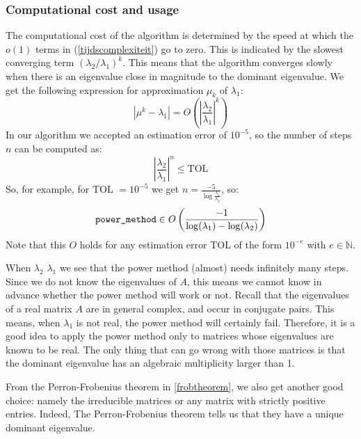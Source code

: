 \documentclass[a4paper,11pt]{report}
\newcommand{\N}{{\mathbb N}}
\begin{document}
\subsubsection{Computational cost and usage}
The computational cost of the algorithm is determined by the speed at which the 
$o(1)$ terms in (\ref{tijdscomplexiteit}) go to zero. This is indicated by the slowest converging term $(\lambda_2/\lambda_1)^k$. This means
that  the algorithm converges slowly when there is an eigenvalue close in magnitude to the dominant eigenvalue. We 
get the following expression for approximation $\mu_k$ of $\lambda_1$:
$$|\mu^k - \lambda_1| = O\left(\left|\frac{\lambda_2}{\lambda_1} \right|^k\right)$$
In our algorithm we accepted an estimation error of $10^{-5}$, so the number of 
steps $n$ can be computed as:
$$\left|\frac{\lambda_2}{\lambda_1} \right|^n \leq \text{TOL}$$
So, for example, for TOL $= 10^{-5}$ we get $n = \frac{-5}{\log{\frac{\lambda_1}{\lambda_2}}}$, so:
$$\text{\texttt{power\_method}} \in O\left(\frac{-1}{\log(\lambda_1) - \log(\lambda_2)}\right)$$
Note that this $O$ holds for any estimation error TOL of the form $10^{-e}$ with $e \in \N$. 

When $\lambda_2$ \approx $\lambda_1$ we see that the power method (almost) needs infinitely 
many steps. Since we do not know the eigenvalues of $A$, this means 
we cannot know in advance whether the power method will work or not. Recall that 
the eigenvalues of a real matrix $A$ are in general complex, and occur in 
conjugate pairs. This means, when $\lambda_1$ is not real, 
the power method will certainly fail. Therefore, it is a good idea to apply the 
power method only to matrices whose eigenvalues are known to be real. The only 
thing that can go wrong with those matrices is that the dominant eigenvalue has 
an algebraic multiplicity larger than 1. 

From the Perron-Frobenius theorem in \ref{frobtheorem}, we also get another good choice: namely the irreducible matrices or any matrix with strictly positive entries.
Indeed, The Perron-Frobenius theorem tells us that they have a unique dominant 
eigenvalue.
\end{document}
